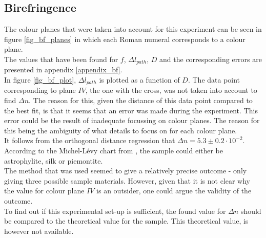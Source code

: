 \newpage
\subsection{Birefringence}
The colour planes that were taken into account for this experiment can be seen in figure \ref{fig_bf_planes} in which each Roman numeral corresponds to a colour plane. \\
The values that have been found for $f$, $\Delta l_{path}$, $D$ and the corresponding errors are presented in appendix \ref{appendix_bf}.\\
In figure \ref{fig_bf_plot}, $\Delta l_{path}$ is plotted as a function of $D$. The data point corresponding to plane $IV$, the one with the cross, was not taken into account to find $\Delta n$. The reason for this, given the distance of this data point compared to the best fit, is that it seems that an error was made during the experiment. This error could be the result of inadequate focussing on colour planes. The reason for this being the ambiguity of what details to focus on for each colour plane.\\
It follows from the orthogonal distance regression that $\Delta n = 5.3 \pm 0.2 \cdot 10^{-2}$. According to the Michel-L\'evy chart from \cite{bf_chart}, the sample could either be astrophylite, silk or piemontite.\\
The method that was used seemed to give a relatively precise outcome - only giving three possible sample materials. However, given that it is not clear why the value for colour plane $IV$ is an outsider, one could argue the validity of the outcome. \\
To find out if this experimental set-up is sufficient, the found value for $\Delta n$ should be compared to the theoretical value for the sample. This theoretical value, is however not available.

